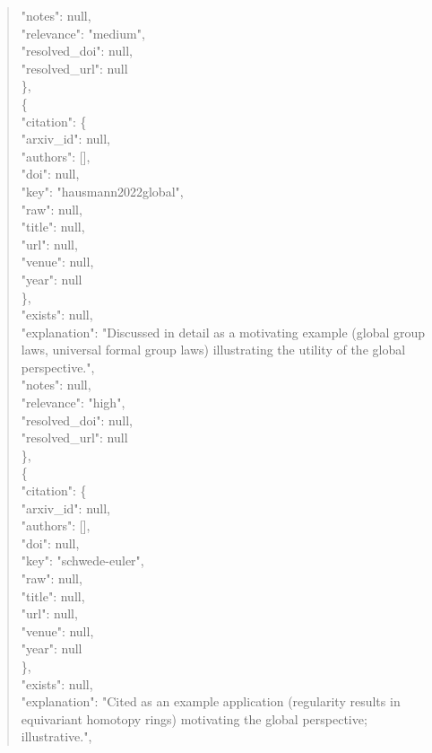\documentclass[11pt]{article}
\begin{document}
\begin{quote}
      "notes": null,\\
      "relevance": "medium",\\
      "resolved\_doi": null,\\
      "resolved\_url": null\\
    \},\\
    \{\\
      "citation": \{\\
        "arxiv\_id": null,\\
        "authors": [],\\
        "doi": null,\\
        "key": "hausmann2022global",\\
        "raw": null,\\
        "title": null,\\
        "url": null,\\
        "venue": null,\\
        "year": null\\
      \},\\
      "exists": null,\\
      "explanation": "Discussed in detail as a motivating example (global group laws, universal formal group laws) illustrating the utility of the global perspective.",\\
      "notes": null,\\
      "relevance": "high",\\
      "resolved\_doi": null,\\
      "resolved\_url": null\\
    \},\\
    \{\\
      "citation": \{\\
        "arxiv\_id": null,\\
        "authors": [],\\
        "doi": null,\\
        "key": "schwede-euler",\\
        "raw": null,\\
        "title": null,\\
        "url": null,\\
        "venue": null,\\
        "year": null\\
      \},\\
      "exists": null,\\
      "explanation": "Cited as an example application (regularity results in equivariant homotopy rings) motivating the global perspective; illustrative.",\\

\end{quote}
\end{document}

